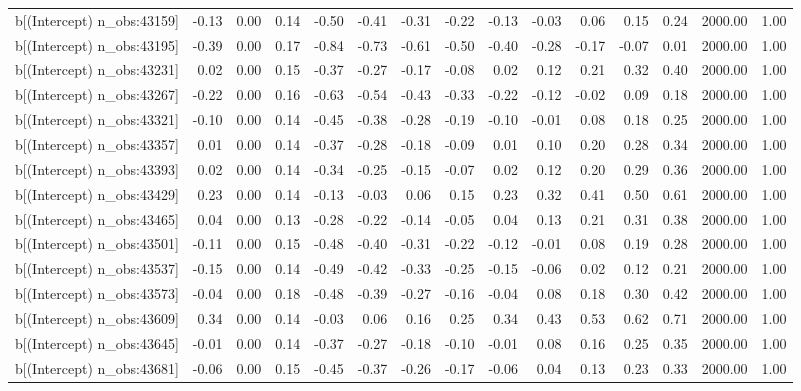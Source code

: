 \begin{table}[ht]
\begin{tabular}{rrrrrrrrrrrrrrr}
  b[(Intercept) n\_obs:43159] & -0.13 & 0.00 & 0.14 & -0.50 & -0.41 & -0.31 & -0.22 & -0.13 & -0.03 & 0.06 & 0.15 & 0.24 & 2000.00 & 1.00 \\ 
  b[(Intercept) n\_obs:43195] & -0.39 & 0.00 & 0.17 & -0.84 & -0.73 & -0.61 & -0.50 & -0.40 & -0.28 & -0.17 & -0.07 & 0.01 & 2000.00 & 1.00 \\ 
  b[(Intercept) n\_obs:43231] & 0.02 & 0.00 & 0.15 & -0.37 & -0.27 & -0.17 & -0.08 & 0.02 & 0.12 & 0.21 & 0.32 & 0.40 & 2000.00 & 1.00 \\ 
  b[(Intercept) n\_obs:43267] & -0.22 & 0.00 & 0.16 & -0.63 & -0.54 & -0.43 & -0.33 & -0.22 & -0.12 & -0.02 & 0.09 & 0.18 & 2000.00 & 1.00 \\ 
  b[(Intercept) n\_obs:43321] & -0.10 & 0.00 & 0.14 & -0.45 & -0.38 & -0.28 & -0.19 & -0.10 & -0.01 & 0.08 & 0.18 & 0.25 & 2000.00 & 1.00 \\ 
  b[(Intercept) n\_obs:43357] & 0.01 & 0.00 & 0.14 & -0.37 & -0.28 & -0.18 & -0.09 & 0.01 & 0.10 & 0.20 & 0.28 & 0.34 & 2000.00 & 1.00 \\ 
  b[(Intercept) n\_obs:43393] & 0.02 & 0.00 & 0.14 & -0.34 & -0.25 & -0.15 & -0.07 & 0.02 & 0.12 & 0.20 & 0.29 & 0.36 & 2000.00 & 1.00 \\ 
  b[(Intercept) n\_obs:43429] & 0.23 & 0.00 & 0.14 & -0.13 & -0.03 & 0.06 & 0.15 & 0.23 & 0.32 & 0.41 & 0.50 & 0.61 & 2000.00 & 1.00 \\ 
  b[(Intercept) n\_obs:43465] & 0.04 & 0.00 & 0.13 & -0.28 & -0.22 & -0.14 & -0.05 & 0.04 & 0.13 & 0.21 & 0.31 & 0.38 & 2000.00 & 1.00 \\ 
  b[(Intercept) n\_obs:43501] & -0.11 & 0.00 & 0.15 & -0.48 & -0.40 & -0.31 & -0.22 & -0.12 & -0.01 & 0.08 & 0.19 & 0.28 & 2000.00 & 1.00 \\ 
  b[(Intercept) n\_obs:43537] & -0.15 & 0.00 & 0.14 & -0.49 & -0.42 & -0.33 & -0.25 & -0.15 & -0.06 & 0.02 & 0.12 & 0.21 & 2000.00 & 1.00 \\ 
  b[(Intercept) n\_obs:43573] & -0.04 & 0.00 & 0.18 & -0.48 & -0.39 & -0.27 & -0.16 & -0.04 & 0.08 & 0.18 & 0.30 & 0.42 & 2000.00 & 1.00 \\ 
  b[(Intercept) n\_obs:43609] & 0.34 & 0.00 & 0.14 & -0.03 & 0.06 & 0.16 & 0.25 & 0.34 & 0.43 & 0.53 & 0.62 & 0.71 & 2000.00 & 1.00 \\ 
  b[(Intercept) n\_obs:43645] & -0.01 & 0.00 & 0.14 & -0.37 & -0.27 & -0.18 & -0.10 & -0.01 & 0.08 & 0.16 & 0.25 & 0.35 & 2000.00 & 1.00 \\ 
  b[(Intercept) n\_obs:43681] & -0.06 & 0.00 & 0.15 & -0.45 & -0.37 & -0.26 & -0.17 & -0.06 & 0.04 & 0.13 & 0.23 & 0.33 & 2000.00 & 1.00 \\ 

\end{tabular}
\end{table}
